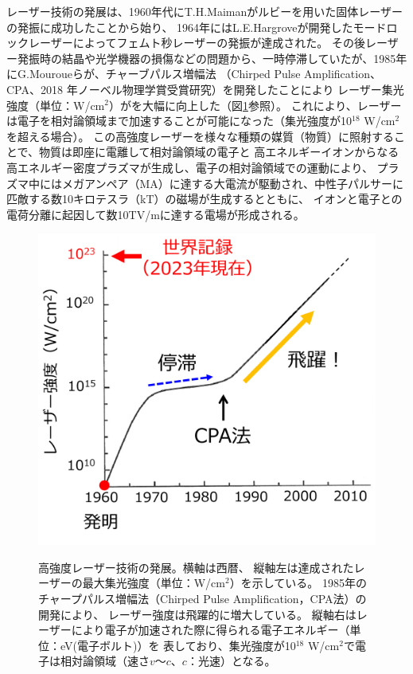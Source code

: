 \documentclass[a4paper,11pt,titlepage]{jarticle}
\numberwithin{equation}{section} %
\begin{document}
レーザー技術の発展は、1960年代にT.H.Maimanがルビーを用いた固体レーザーの発振に成功した\cite{ft1}ことから始り、
1964年にはL.E.Hargroveが開発したモードロックレーザーによってフェムト秒レーザーの発振が達成された\cite{ft2}。
その後レーザー発振時の結晶や光学機器の損傷などの問題から、一時停滞していたが、1985年にG.Mouroueらが、チャーブパルス増幅法
（Chirped Pulse Amplification、CPA、2018 年ノーベル物理学賞受賞研究）\cite{ft3}を開発したことにより
レーザー集光強度（単位：W/cm$^{2}$）がを大幅に向上した（図\ref{fig:1}参照）。
これにより、レーザーは電子を相対論領域まで加速することが可能になった（集光強度が10$^{18}$ W/cm$^{2}$を超える場合）。
この高強度レーザーを様々な種類の媒質（物質）に照射することで、物質は即座に電離して相対論領域の電子と
高エネルギーイオンからなる高エネルギー密度プラズマが生成し、電子の相対論領域での運動により、
プラズマ中にはメガアンペア（MA）に達する大電流が駆動され、中性子パルサーに匹敵する数10キロテスラ（kT）の磁場が生成するとともに、
イオンと電子との電荷分離に起因して数10TV/mに達する電場が形成される。

\begin{figure}[H]
  \begin{center}
    \includegraphics[scale=1]{./image/1-laser.png}
    \label{fig:1}
    \caption{高強度レーザー技術の発展。横軸は西暦、
    縦軸左は達成されたレーザーの最大集光強度（単位：W/cm$^2$）を示している。
    1985年のチャープパルス増幅法（Chirped Pulse Amplification，CPA法）の開発により、
    レーザー強度は飛躍的に増大している。
    縦軸右はレーザーにより電子が加速された際に得られる電子エネルギー（単位：eV(電子ボルト)）を
    表しており、集光強度が10$^{18}$ W/cm$^{2}$で電子は相対論領域（速さ$v$～$c$、$c$：光速）となる。}
  \end{center}
\end{figure}
\end{document}
